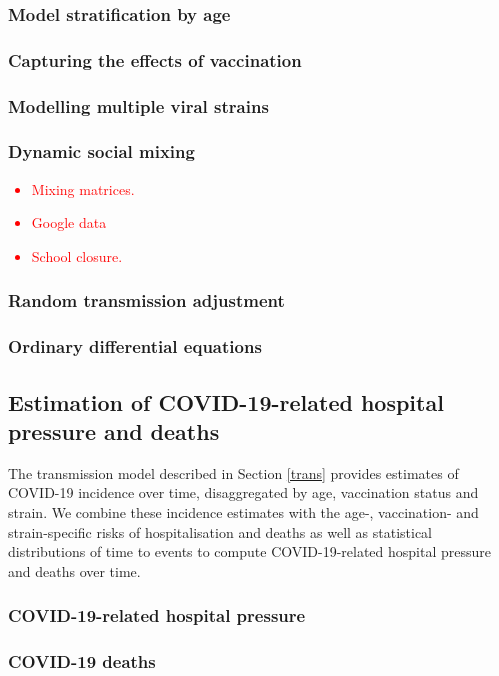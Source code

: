\subsubsection{Model stratification by age}
\label{age}


\subsubsection{Capturing the effects of vaccination}


\subsubsection{Modelling multiple viral strains}
 


\subsubsection{Dynamic social mixing}

\textcolor{red}{\begin{itemize}
    \item Mixing matrices.
    \item Google data
    \item School closure.
\end{itemize}
}
\subsubsection{Random transmission adjustment}
 

\subsubsection{Ordinary differential equations}
\label{ODEs}
 



\subsection{Estimation of COVID-19-related hospital pressure and deaths}
The transmission model described in Section \ref{trans} provides estimates of COVID-19 incidence over time, disaggregated by age, vaccination status and strain. 
We combine these incidence estimates with the age-, vaccination- and strain-specific risks of hospitalisation and deaths as well as 
statistical distributions of time to events to compute COVID-19-related hospital pressure and deaths over time.

\subsubsection{COVID-19-related hospital pressure}
\label{hosp}
 

\subsubsection{COVID-19 deaths}
 

